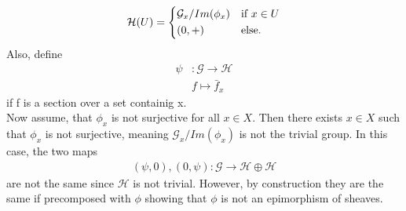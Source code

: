 \begin{exercise}{3}
\begin{enumerate}
\begin{equation*}
        \mathcal{H}(U)=
        \begin{cases*}
            \mathcal{G}_x/Im(\phi_x) & \text{if} $x\in U$\\
            (0,+) & else.
        \end{cases*}
    \end{equation*}
    Also, define
    \begin{align*}
        \psi&:\mathcal{G}\to \mathcal{H}\\
            &f\mapsto \bar{f}_x
    \end{align*}
    if f is a section over a set containig x. \\
    Now assume, that $\phi_x$ is not surjective for all $x\in X$.
    Then there exists $x\in X$ such that $\phi_x$ is not surjective,
    meaning $\mathcal{G}_x/Im(\phi_x)$ is not the trivial group. 
    In this case, the two maps 
    \begin{align*}
        (\psi,0),(0,\psi):\mathcal{G}\to \mathcal{H} \oplus \mathcal{H}
    \end{align*}
    are not the same since $\mathcal{H}$ is not trivial. However,
     by construction they are the same if precomposed with $\phi$
     showing that $\phi$ is not an epimorphism of sheaves.
\end{enumerate}
\end{exercise}

